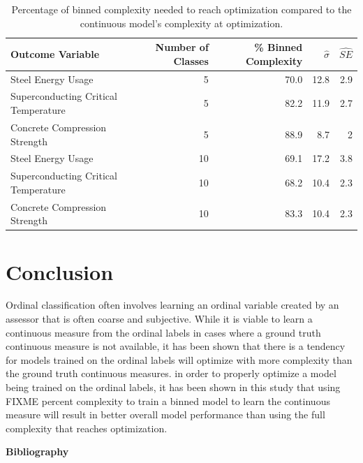 \documentclass[10pt]{article}\usepackage[]{graphicx}\usepackage[]{xcolor}
\begin{document}
\begin{table}[h!]
  \begin{center}
    \caption{Percentage of binned complexity needed to reach optimization compared to the continuous model's complexity at optimization.}
    \label{tab:complexity_change}
    \begin{tabular}{l|r|r|r|r}
      \textbf{Outcome Variable} & \textbf{Number of Classes} & \textbf{\% Binned Complexity} & $\hat{\sigma}$ & $\hat{SE}$ \\
      \hline
      Steel Energy Usage & 5 & 70.0 & 12.8 & 2.9 \\
      Superconducting Critical Temperature & 5 & 82.2 & 11.9 & 2.7 \\
      Concrete Compression Strength & 5 & 88.9 & 8.7 & 2 \\
      Steel Energy Usage & 10 & 69.1 & 17.2 & 3.8 \\
      Superconducting Critical Temperature & 10 & 68.2 & 10.4 & 2.3 \\
      Concrete Compression Strength & 10 & 83.3 & 10.4 & 2.3 \\
    \end{tabular}
  \end{center}
\end{table}


\newpage




\section{Conclusion}
Ordinal classification often involves learning an ordinal variable created by an assessor that is often coarse and subjective. While it is viable to learn a continuous measure from the ordinal labels in cases where a ground truth continuous measure is not available, it has been shown that there is a tendency for models trained on the ordinal labels will optimize with more complexity than the ground truth continuous measures. in order to properly optimize a model being trained on the ordinal labels, it has been shown in this study that using FIXME percent complexity to train a binned model to learn the continuous measure will result in better overall model performance than using the full complexity that reaches optimization.



\Large
{\bf Bibliography}




\end{document}
